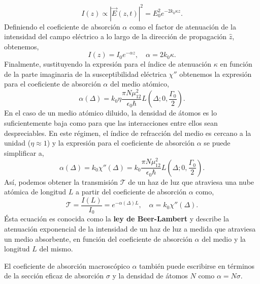 \begin{equation}
    I(z) \propto |\vec{E}(z,t)|^2 = E_0^2 e^{- 2 k_0 \kappa z}.
\end{equation}
Definiendo el coeficiente de absorción $\alpha$ como el factor de atenuación de la intensidad del campo eléctrico a lo largo de la dirección de propagación $\hat{z}$, obtenemos,   
\begin{equation}
    I(z) = I_0 e^{-\alpha z}, \quad \alpha = 2 k_0 \kappa.
\end{equation}
Finalmente, sustituyendo la expresión para el índice de atenuación $\kappa$ en función de la parte imaginaria de la susceptibilidad eléctrica $\chi''$ obtenemos la expresión para el coeficiente de absorción $\alpha$ del medio atómico,
\begin{equation}
        \alpha(\Delta) = k_0 \eta \frac{\pi N \mu_{12}^2}{\epsilon_0 \hbar} L\left(\Delta; 0, \frac{\Gamma_0}{2}\right).
\end{equation}
En el caso de un medio atómico diluido, la densidad de átomos es lo suficientemente baja como para que las interacciones entre ellos sean despreciables. En este régimen, el índice de refracción del medio es cercano a la unidad ($\eta \approx 1$) y la expresión para el coeficiente de absorción $\alpha$ se puede simplificar a,
\begin{equation}
    \alpha(\Delta) = k_0 \chi''(\Delta) = k_0 \frac{\pi N \mu_{12}^2}{\epsilon_0 \hbar} L\left(\Delta; 0, \frac{\Gamma_0}{2}\right).
\end{equation}
Así, podemos obtener la transmisión $\mathscr{T}$ de un haz de luz que atraviesa una nube atómica de longitud $L$ a partir del coeficiente de absorción $\alpha$ como,
\begin{equation}
    \boxed{
        \mathscr{T} = \frac{I(L)}{I_0} =  e^{-\alpha(\Delta) L}, \quad \alpha = k_0 \chi''(\Delta).
    }
\end{equation}
Ésta ecuación es conocida como la \textbf{ley de Beer-Lambert} y describe la atenuación exponencial de la intensidad de un haz de luz a medida que atraviesa un medio absorbente, en función del coeficiente de absorción $\alpha$ del medio y la longitud $L$ del mismo. 

El coeficiente de absorción macroscópico $\alpha$ también puede escribirse en términos de la sección eficaz de absorción $\sigma$ y la densidad de átomos $N$ como $\alpha = N \sigma$. 

